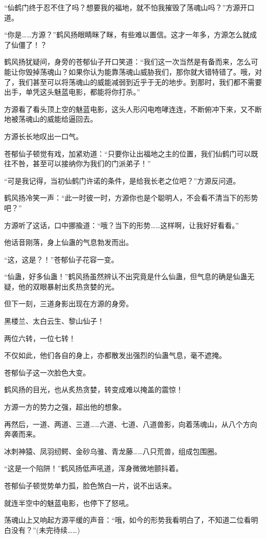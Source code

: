 \begin{this_body}
“仙鹤门终于忍不住了吗？想要我的福地，就不怕我摧毁了荡魂山吗？”方源开口道。

“你是……方源？”鹤风扬眼睛眯了眯，有些难以置信。这才一年多，方源怎么就成了仙僵了！？

鹤风扬犹疑间，身旁的苍郁仙子开口笑道：“我们这一次当然是有备而来，怎么可能让你毁掉荡魂山？如果你认为能靠荡魂山威胁我们，那你就大错特错了。哦，对了，我们甚至可以将荡魂山的威能减弱到近乎于无的地步。到那时，我们都不需要出手，单凭这头魅蓝电影，都能将你打杀。”

方源看了看头顶上空的魅蓝电影，这头人形闪电咆哮连连，不断俯冲下来，又不断地被荡魂山的威能给逼回去。

方源长长地叹出一口气。

苍郁仙子顿觉有戏，加紧劝道：“只要你让出福地之主的位置，我们仙鹤门可以既往不咎，甚至可以接纳你为我们的门派弟子！”

“可是我记得，当初仙鹤门许诺的条件，是给我长老之位吧？”方源反问道。

鹤风扬冷笑一声：“此一时彼一时，方源你也是个聪明人，不会看不清当下的形势吧？”

方源听了这话，口中挪揄道：“哦？当下的形势……这样啊，让我好好看看。”

他话音刚落，身上仙蛊的气息勃发而出。

“这，这是？！”苍郁仙子花容一变。

“仙蛊，好多仙蛊！”鹤风扬虽然辨认不出究竟是什么仙蛊，但气息的确是仙蛊无疑，他的双眼暴射出炙热贪婪的光。

但下一刻，三道身影出现在方源的身旁。

黑楼兰、太白云生、黎山仙子！

两位六转，一位七转！

不仅如此，他们各自的身上，亦都散发出强烈的仙蛊气息，毫不遮掩。

苍郁仙子这一次脸色大变。

鹤风扬的目光，也从炙热贪婪，转变成难以掩盖的震惊！

方源一方的势力之强，超出他的想象。

再然后，一道、两道、三道……六道、七道、八道兽影，向着荡魂山，从八个方向奔袭而来。

冰刺神猿、凤羽纫鳄、金砂乌骓、青龙藤……八只荒兽，组成包围圈。

“这是一个陷阱！”鹤风扬低声吼道，浑身微微地颤抖着。

苍郁仙子顿觉势单力孤，脸色煞白一片，说不出话来。

就连半空中的魅蓝电影，也停下了怒吼。

荡魂山上又响起方源平缓的声音：“哦，如今的形势我看明白了，不知道二位看明白没有？”(未完待续……)

\end{this_body}

